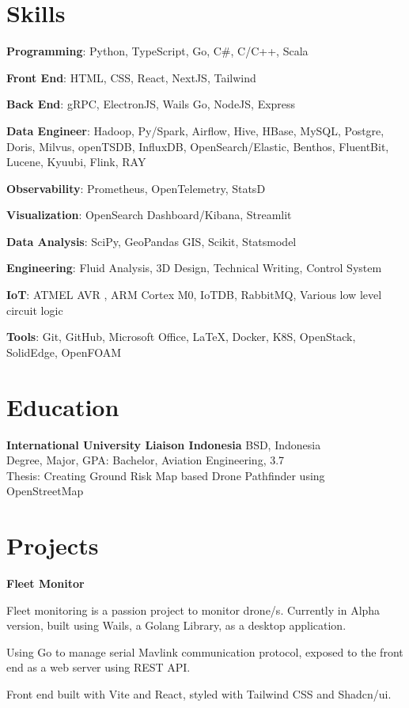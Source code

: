 \documentclass[12pt]{report}
\begin{document}
    \section*{Skills}
    \begin{myitemize}[left=0pt]
        \item \textbf{Programming}: Python, TypeScript, Go, C\#, C/C++, Scala
        \item \textbf{Front End}: HTML, CSS, React, NextJS, Tailwind
        \item \textbf{Back End}: gRPC, ElectronJS, Wails Go, NodeJS, Express
        \item \textbf{Data Engineer}: Hadoop, Py/Spark, Airflow, Hive, HBase, MySQL, Postgre, Doris, Milvus, openTSDB,
        InfluxDB, OpenSearch/Elastic, Benthos, FluentBit, Lucene, Kyuubi, Flink, RAY
        \item \textbf{Observability}: Prometheus, OpenTelemetry, StatsD
        \item \textbf{Visualization}: OpenSearch Dashboard/Kibana, Streamlit 
        \item \textbf{Data Analysis}: SciPy, GeoPandas GIS, Scikit, Statsmodel
        \item \textbf{Engineering}: Fluid Analysis, 3D Design, Technical Writing, Control System
        \item \textbf{IoT}: ATMEL AVR , ARM Cortex M0, IoTDB, RabbitMQ, Various low level circuit logic
        \item \textbf{Tools}: Git, GitHub, Microsoft Office, LaTeX, Docker, K8S, OpenStack, SolidEdge, OpenFOAM
    \end{myitemize}

    \section*{Education}
    \textbf{International University Liaison Indonesia} \hfill BSD, Indonesia \\
    Degree, Major, GPA: Bachelor, Aviation Engineering, 3.7 \\
    Thesis: Creating Ground Risk Map based Drone Pathfinder using OpenStreetMap

    \section*{Projects}
    \textbf{Fleet Monitor} \\
    \begin{myitemize}[left=0pt]
        \item Fleet monitoring is a passion project to monitor drone/s. Currently in Alpha version, built using Wails, a Golang Library, as a desktop application.
        \item Using Go to manage serial Mavlink communication protocol, exposed to the front end as a web server using REST API.
        \item Front end built with Vite and React, styled with Tailwind CSS and Shadcn/ui.
    \end{myitemize}
\end{document}
